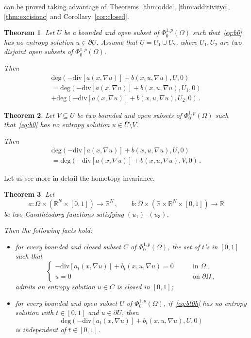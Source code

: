 \documentclass[twoside,reqno]{amsart}
\numberwithin{equation}{section}
\newtheorem{thm}{Theorem}[section]
\theoremstyle{definition}
\newcommand{\R}{\mathbb{R}}
\begin{document}
can be proved taking advantage
of~Theorems~\ref{thm:oddc}, \ref{thm:additivityc}, 
\ref{thm:excisionc} and Corollary~\ref{cor:closed}.
%
\begin{thm}
\label{thm:additivity0}
Let $U$ be a bounded and open subset of $\Phi^{1,p}_0(\Omega)$
such that~\eqref{eq:b0} has no entropy solution  
$u\in\partial U$.
Assume that $U=U_1\cup U_2$, where $U_1, U_2$ are two disjoint 
open subsets of $\Phi^{1,p}_0(\Omega)$.
\par
Then
\begin{multline*}
\mathrm{deg}(- \mathrm{div}[a(x,\nabla u)] 
+ b(x,u,\nabla u),U,0) \\
= \mathrm{deg}(- \mathrm{div}[a(x,\nabla u)] 
+ b(x,u,\nabla u),U_1,0) \\
+ \mathrm{deg}(- \mathrm{div}[a(x,\nabla u)] 
+ b(x,u,\nabla u),U_2,0)\,.
\end{multline*}
\end{thm}
%
\begin{thm}
\label{thm:excision0}
Let $V\subseteq U$ be two bounded and open subsets of 
$\Phi^{1,p}_0(\Omega)$ such that~\eqref{eq:b0} has no
entropy solution $u\in\overline{U}\setminus V$.
\par
Then
\begin{multline*}
 \mathrm{deg}(- \mathrm{div}[a(x,\nabla u)] 
+ b(x,u,\nabla u),U,0) \\
= \mathrm{deg}(- \mathrm{div}[a(x,\nabla u)] 
+ b(x,u,\nabla u),V,0)\,.
\end{multline*}
\end{thm}
%
Let us see more in detail the homotopy invariance.
%
\begin{thm}
\label{thm:homotopy0}
Let
\[
a:\Omega\times(\R^N\times[0,1])\rightarrow \R^N\,,\qquad
b:\Omega\times(\R\times\R^N\times[0,1])\rightarrow \R
\]
be two Carath\'eodory functions satisfying $(u_1)$--$(u_3)$.
\par
Then the following facts hold:
\begin{itemize}
\item[$(a)$]
for every bounded and closed subset $C$ of $\Phi^{1,p}_0(\Omega)$,
the set of $t$'s in $[0,1]$ such that
\begin{equation}
\label{eq:bt0h}
\begin{cases}
- \mathrm{div}[a_t(x,\nabla u)] + b_t(x,u,\nabla u)=0 
&\qquad\text{in $\Omega$}\,,\\
u=0
&\qquad\text{on $\partial\Omega$}\,,
\end{cases}
\end{equation}
admits an entropy solution $u\in C$ is closed in $[0,1]$;
\item[$(b)$]
for every bounded and open subset $U$ of $\Phi^{1,p}_0(\Omega)$,
if~\eqref{eq:bt0h} has no entropy solution 
with $t\in[0,1]$ and $u\in\partial U$, then
\[
\mathrm{deg}(- \mathrm{div}[a_t(x,\nabla u)] 
+ b_t(x,u,\nabla u),U,0)
\]
is independent of $t\in[0,1]$.
\end{itemize}
\end{thm}
\end{document}
